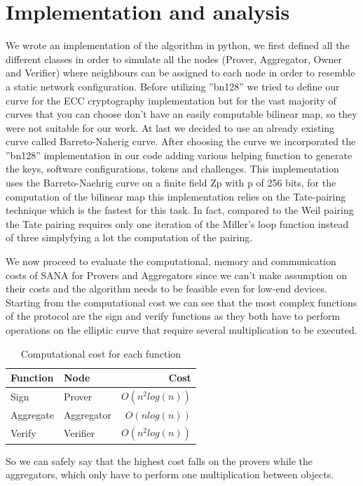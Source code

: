 \documentclass[10pt, a4paper, twocolumn]{article} %
\begin{document}
\section{Implementation and analysis}

We wrote an implementation of the algorithm in python, we first defined all the different classes in order to simulate all the nodes (Prover, Aggregator, Owner and Verifier) where neighbours can be assigned to each node in order to resemble a static network configuration.
Before utilizing ''bn128'' we tried to define our curve for the ECC cryptography implementation but for the vast majority of curves that you can choose don't have an easily computable bilinear map, so they were not suitable for our work. At last we decided to use an already existing curve called Barreto-Naherig curve.
After choosing the curve we incorporated the ''bn128'' implementation in our code adding various helping function to generate the keys, software configurations, tokens and challenges.
This implementation uses the Barreto-Naehrig curve on a finite field Zp with p of 256 bits, for the computation of the bilinear map this implementation relies on the Tate-pairing technique which is the fastest for this task. In fact, compared to the Weil pairing the Tate pairing requires only one iteration of the Miller's loop function instead of three simplyfying a lot the computation of the pairing.

We now proceed to evaluate the computational, memory and communication costs of SANA for Provers and Aggregators since we can't make assumption on their costs and the algorithm needs to be feasible even for low-end devices.
Starting from the computational cost we can see that the most complex functions of the protocol are the sign and verify functions as they both have to perform operations on the elliptic curve that require several multiplication to be executed.
\begin{table}
	\caption{Computational cost for each function}
	\centering
	\begin{tabular}{llr}
		\toprule
		Function & Node & Cost \\
		\midrule
		Sign & Prover & $O(n^2log(n))$ \\
		Aggregate & Aggregator & $O(n log(n))$ \\
		Verify & Verifier & $O(n^2log(n))$ \\
		\bottomrule
	\end{tabular}
\end{table}
So we can safely say that the highest cost falls on the provers while the aggregators, which only have to perform one multiplication between objects.
\end{document}
